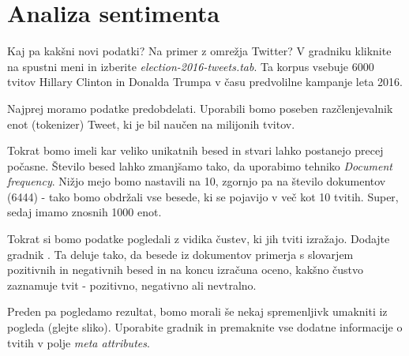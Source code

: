 \chapter{Analiza sentimenta}
\label{ch:analiza-sentimenta}

Kaj pa kakšni novi podatki? Na primer z omrežja Twitter? V gradniku  kliknite na spustni meni in izberite \textit{election-2016-tweets.tab}. Ta korpus vsebuje 6000 tvitov Hillary Clinton in Donalda Trumpa v času predvolilne kampanje leta 2016.

Najprej moramo podatke predobdelati. Uporabili bomo poseben razčlenjevalnik enot (tokenizer) Tweet, ki je bil naučen na milijonih tvitov.

Tokrat bomo imeli kar veliko unikatnih besed in stvari lahko postanejo precej počasne. Število besed lahko zmanjšamo tako, da uporabimo tehniko \textit{Document frequency}. Nižjo mejo bomo nastavili na 10, zgornjo pa na število dokumentov (6444) - tako bomo obdržali vse besede, ki se pojavijo v več kot 10 tvitih. Super, sedaj imamo znosnih 1000 enot.

Tokrat si bomo podatke pogledali z vidika čustev, ki jih tviti izražajo. Dodajte gradnik . Ta deluje tako, da besede iz dokumentov primerja s slovarjem pozitivnih in negativnih besed in na koncu izračuna oceno, kakšno čustvo zaznamuje tvit - pozitivno, negativno ali nevtralno.

Preden pa pogledamo rezultat, bomo morali še nekaj spremenljivk umakniti iz pogleda (glejte sliko). Uporabite gradnik  in premaknite vse dodatne informacije o tvitih v polje \textit{meta attributes}.

